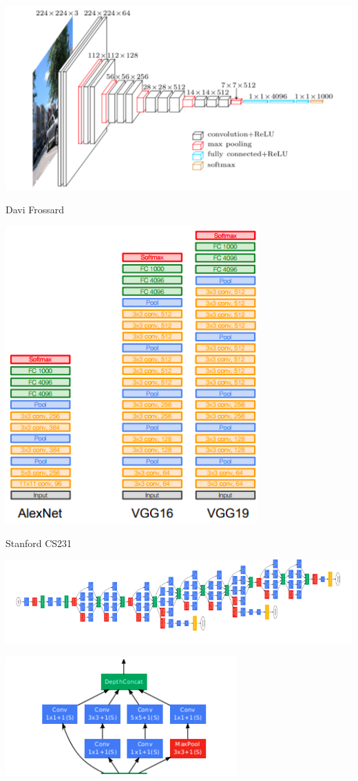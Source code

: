 {

\centerline{\includegraphics[width = 9.0in]{../images/VGG}}
\centerline{\large Davi Frossard}

\centerline{\includegraphics[height=4.5in]{../images/VGGStack}}
\centerline{\large Stanford CS231}


\centerline{\includegraphics[width = 9.0in]{../images/inception1}}
\vfill
\centerline{\includegraphics[width = 3.5in]{../images/inception2}}

}
